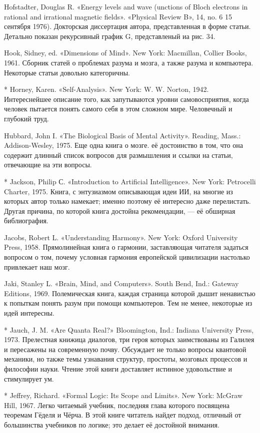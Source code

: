 Hofstadter, Douglas R. «Energy levels and wave (unctions of Bloch electrons in rational and irrational magnetic fields». «Physical Review B», 14, no. 6 15 сентября 1976). Докторская диссертация автора, представленная в форме статьи. Детально показан рекурсивный график G, представленый иа рис. 34.

Hook, Sidney, ed. «Dimensions of Mind». New York: Macmillan, Collier Books, 1961. Сборник статей о проблемах разума и мозга, а также разума и компьютера. Некоторые статьи довольно категоричны.

* Horney, Karen. «Self-Analysis». New York: W. W. Norton, 1942. Интереснейшее описание того, как запутываются уровни самовосприятия, когда человек пытается понять самого себя в этом сложном мире. Человечный и глубокий труд.

Hubbard, John I. «The Biological Basis of Mental Activity». Reading, Mass.: Addison-Wesley, 1975. Еще одна книга о мозге. её достоинство в том, что она содержит длинный список вопросов для размышления и ссылки на статьи, отвечающие на эти вопросы.

* Jackson, Philip С. «Introduction to Artificial Intelligence». New York: Petrocelli Charter, 1975. Книга, с энтузиазмом описывающая идеи ИИ, на многие из которых автор только намекает; именно поэтому её интересно даже перелистать. Другая причина, по которой книга достойна рекомендации, --- её обширная библиография.

Jacobs, Robert L. «Understanding Harmony». New York: Oxford University Press, 1958. Прямолинейная книга о гармонии, заставляющая читателя задаться вопросом о том, почему условная гармония европейской цивилизации настолько привлекает наш мозг.

Jaki, Stanley L. «Brain, Mind, and Computers». South Bend, Ind.: Gateway Editions, 1969. Полемическая книга, каждая страница которой дышит ненавистью к попыткам понять разум при помощи компьютеров. Тем не менее, некоторые из идей интересны.

* Jauch, J. M. «Are Quanta Real?» Bloomington, Ind.: Indiana University Press, 1973. Прелестная книжица диалогов, три героя которых заимствованы из Галилея и пересажены на современную почву. Обсуждает не только вопросы квантовой механики, но также темы узнавания структур, простоты, мозговых процессов и философии науки. Чтение этой книги доставляет истинное удовольствие и стимулирует ум.

* Jeffrey, Richard. «Formal Logic: Its Scope and Limits». New York: McGraw Hill, 1967. Легко читаемый учебник, последняя глава которого посвящена теоремам Гёделя и Чёрча. В этой книге читатель найдет подход, отличный от большинства учебников по логике; это делает её достойной внимания.


